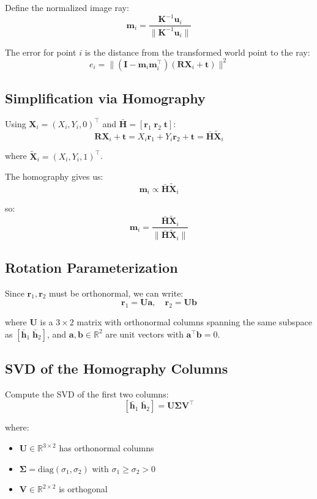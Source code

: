 \documentclass[11pt]{article}
\newcommand{\vect}[1]{\mathbf{#1}}
\newcommand{\mat}[1]{\mathbf{#1}}
\begin{document}
Define the normalized image ray:
\[
\vect{m}_i = \frac{\mat{K}^{-1}\vect{u}_i}{\|\mat{K}^{-1}\vect{u}_i\|}
\]

The error for point $i$ is the distance from the transformed world point to the ray:
\[
e_i = \|(\mat{I} - \vect{m}_i\vect{m}_i^\top)(\mat{R}\vect{X}_i + \vect{t})\|^2
\]

\subsection{Simplification via Homography}

Using $\vect{X}_i = (X_i, Y_i, 0)^\top$ and $\bar{\mat{H}} = [\vect{r}_1 \; \vect{r}_2 \; \vect{t}]$:
\[
\mat{R}\vect{X}_i + \vect{t} = X_i\vect{r}_1 + Y_i\vect{r}_2 + \vect{t} = \bar{\mat{H}}\tilde{\vect{X}}_i
\]

where $\tilde{\vect{X}}_i = (X_i, Y_i, 1)^\top$.

The homography gives us:
\[
\vect{m}_i \propto \bar{\mat{H}}\tilde{\vect{X}}_i
\]

so:
\[
\vect{m}_i = \frac{\bar{\mat{H}}\tilde{\vect{X}}_i}{\|\bar{\mat{H}}\tilde{\vect{X}}_i\|}
\]

\subsection{Rotation Parameterization}

Since $\vect{r}_1, \vect{r}_2$ must be orthonormal, we can write:
\[
\vect{r}_1 = \mat{U}\vect{a}, \quad \vect{r}_2 = \mat{U}\vect{b}
\]

where $\mat{U}$ is a $3 \times 2$ matrix with orthonormal columns spanning the same subspace as $[\bar{\vect{h}}_1 \; \bar{\vect{h}}_2]$, and $\vect{a}, \vect{b} \in \mathbb{R}^2$ are unit vectors with $\vect{a}^\top\vect{b} = 0$.

\subsection{SVD of the Homography Columns}

Compute the SVD of the first two columns:
\[
[\bar{\vect{h}}_1 \; \bar{\vect{h}}_2] = \mat{U}\mat{\Sigma}\mat{V}^\top
\]

where:
\begin{itemize}
    \item $\mat{U} \in \mathbb{R}^{3 \times 2}$ has orthonormal columns
    \item $\mat{\Sigma} = \text{diag}(\sigma_1, \sigma_2)$ with $\sigma_1 \geq \sigma_2 > 0$
    \item $\mat{V} \in \mathbb{R}^{2 \times 2}$ is orthogonal
\end{itemize}
\end{document}
